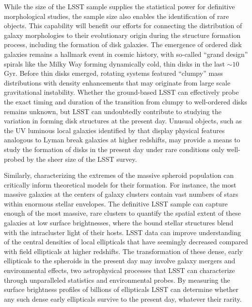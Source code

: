 {While the size of the LSST sample supplies the
statistical power for definitive morphological studies,
the sample size also enables the identification of rare
objects. This capability will benefit our efforts for
connecting the distribution of galaxy morphologies to their
evolutionary origin during the structure formation process,
including the formation of disk galaxies.
The emergence of ordered disk galaxies remains a hallmark
event in cosmic history, with so-called ``grand design''
spirals like the Milky Way forming dynamically cold, thin
disks in the last $\sim10$ Gyr. Before thin disks emerged,
rotating systems featured ``clumpy'' mass distributions with
density enhancements
that may originate from large scale gravitational instability.
Whether the ground-based LSST can effectively probe
the exact timing and duration of the transition from
clumpy to well-ordered disks remains 
unknown, but LSST can undoubtedly contribute to studying the
variation in forming disk structures at the present day.
Unusual objects, such as the UV luminous local galaxies identified
by \citet{heckman2005a} that display physical features analogous to 
Lyman break galaxies at higher redshifts, may provide a 
means to study the formation of disks in the present day
under rare conditions only well-probed by the sheer size
of the LSST survey.

Similarly, characterizing the extremes of the
massive spheroid population can critically inform
theoretical models for their formation. For instance,
the most massive galaxies at the centers of galaxy clusters
contain vast numbers of stars within enormous stellar
envelopes. The definitive LSST sample can capture enough
of the most massive, rare clusters to quantify the 
spatial extent of these galaxies at
low surface brightnesses, where the bound stellar
structures blend with the intracluster light of
their hosts. 
LSST data
can improve understanding of
the central densities of local
ellipticals that have seemingly decreased compared with
field ellipticals at higher redshifts. The transformation
of these dense, early ellipticals to the spheroids in the
present day may involve galaxy mergers and environmental
effects, two astrophysical processes that LSST can characterize
through unparalleled statistics and environmental probes.
By measuring the
surface brightness profiles of billions of 
ellipticals LSST can determine whether any such dense
early ellipticals survive to the present day, whatever
their rarity.

}
